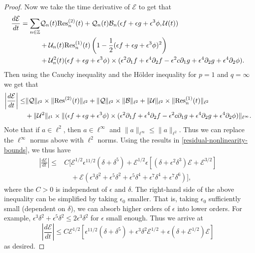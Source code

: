 \begin{proof}
	Now we take the time derivative of \(\mathcal E\) to get that 
	\begin{equation}
	\begin{aligned}
		\frac{d\mathcal{E}}{dt} = \sum_{n \in \mathbb{Z}} &\mathcal Q_n(t) \mathrm{Res}_n^{(2)}(t) + \mathcal Q_n(t) 	\mathcal B_n(\epsilon f + \epsilon g + \epsilon^3 \phi, \mathcal U(t)) \\
		&+ \mathcal U_n(t) \mathrm{Res}_n^{(1)}(t) \left( 1 - \frac 12 (\epsilon f+ \epsilon g + \epsilon^3 \phi)^2  \right) \\
		&+ \mathcal U_n^2(t)(\epsilon f + \epsilon g + \epsilon^3 \phi) \times (\epsilon^2\partial_1 f + \epsilon^4\partial_2 f -\epsilon^2 c \partial_1 g + \epsilon^4 \partial_2 g + \epsilon^4 \partial_2 \phi).
	\end{aligned}
	\end{equation}
	Then using the Cauchy inequality and the H\"older inequality for \(p=1\) and \(q=\infty\) we get that
	\begin{equation}
	\begin{aligned}
		\left| \frac{d\mathcal E}{dt} \right| \leq& \| \mathcal Q \|_{\ell^2 }\times \|\mathrm{Res}^{(2)}(t) \|_{\ell^2} + \| \mathcal Q \|_{\ell^2} \times \| \mathcal B \|_{\ell^2}  + \|\mathcal U \|_{\ell^2} \times \| \mathrm{Res}_n^{(1)}(t) \|_{\ell^2}\\
		& + \|\mathcal U^2 \|_{\ell^1} \times  \| (\epsilon f+ \epsilon g + \epsilon^3 \phi)  \times  (\epsilon^2\partial_1 f + \epsilon^4\partial_2 f -\epsilon^2 c \partial_1 g + \epsilon^4 \partial_2 g + \epsilon^4 \partial_2 \phi )\|_{\ell^\infty} .
	\end{aligned}
	\end{equation}
	Note that if \(a \in \ell^2\), then \(a\in \ell^\infty\) and \(\|a\|_{\ell^\infty} \leq \|a \|_{\ell^2}\). Thus we can replace the \(\ell^\infty\) norms above with \(\ell^2\) norms. Using the results in \cref{residual-nonlinearity-bounds}, we thus have 
	\begin{equation}
	\begin{aligned}
		\left| \frac{d\mathcal E}{dt} \right| \leq& C\Big[\mathcal E^{1/2} \epsilon^{11/2}(\delta + \delta^5) + \mathcal E^{1/2}\epsilon [(\delta + \epsilon^2 \delta^3)\mathcal E + \mathcal E^{3/2}]  \\
		&\quad + \mathcal E(\epsilon^3 \delta^2 + \epsilon^5\delta^2 + \epsilon^5 \delta^4 + \epsilon^7\delta^4 + \epsilon^7 \delta^6) \Big],
	\end{aligned}
	\end{equation}
 	where the \(C>0\) is independent of \(\epsilon\) and \(\delta\). The right-hand side of the above inequality can be simplified by taking \(\epsilon_0\) smaller. That is, taking \(\epsilon_0\) sufficiently small (dependent on \(\delta\)), we can absorb higher orders of \(\epsilon\) into lower orders. For example, \(\epsilon^3 \delta^2 + \epsilon^5\delta^2 \leq 2 \epsilon^3 \delta^2\) for \(\epsilon\) small enough. Thus we arrive at  		
	\begin{equation}
		\left|\frac{d\mathcal E}{dt} \right| \leq C \mathcal E^{1/2}\left[ \epsilon^{11/2} (\delta + \delta^5)  + \epsilon^3\delta^2\mathcal E^{1/2} + \epsilon(\delta + \mathcal{E}^{1/2})\mathcal E\right]
	\end{equation}
	as desired.
\end{proof}
